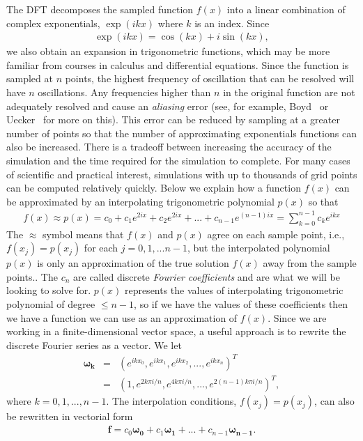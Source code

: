 The DFT decomposes the sampled function $f(x)$ into a linear combination of complex exponentials, $\exp(ikx)$ where $k$ is an index. Since
\begin{eqnarray}
\exp(ikx)=\cos(kx)+i\sin(kx),
\end{eqnarray}
we also obtain an expansion in trigonometric functions, which may be more familiar from courses in calculus and differential equations. Since the function is sampled at $n$ points, the highest frequency of oscillation that can be resolved will have $n$ oscillations. Any frequencies higher than $n$ in the original function are not adequately resolved and cause an \emph{aliasing} error (see, for example, Boyd~\cite{Boy01} or Uecker~\cite{Uec09} for more on this). This error can be reduced by sampling at a greater number of points so that the number of approximating exponentials functions can also be increased. There is a tradeoff between increasing the accuracy of the simulation and the time required for the simulation to complete. For many cases of scientific and practical interest, simulations with up to thousands of grid points can be computed relatively quickly. Below we explain how a function $f(x)$ can be approximated by an interpolating trigonometric polynomial $p(x)$ so that 
\begin{eqnarray}
f(x) \approx p(x)=c_0+c_1e^{2ix}+c_2e^{2ix}+...+c_{n-1} e^{(n-1)ix}=\sum\limits_{k=0}^{n-1} c_k e^{ikx}
\end{eqnarray} 
The $\approx$ symbol means that $f(x)$ and $p(x)$ agree on each sample point, i.e., $f(x_j)=p(x_j)$ for each $j=0,1,...n-1$, but the interpolated polynomial $p(x)$ is only an approximation of the true solution $f(x)$ away from the sample points.. The $c_n$ are called discrete \emph{Fourier coefficients} and are what we will be looking to solve for. $p(x)$ represents the values of interpolating trigonometric polynomial of degree $\leq n-1$, so if we have the values of these coefficients then we have a function we can use as an approximation of $f(x)$. Since we are working in a finite-dimensional vector space, a useful approach is to rewrite the discrete Fourier series as a vector. We let
\begin{eqnarray}
\bm{\omega_k}&=&(e^{ikx_0},e^{ikx_1},e^{ikx_2},...,e^{ikx_n})^T \\
&=& (1,e^{2k \pi i/n},e^{4k\pi i/n},...,e^{2(n-1)k\pi i/n})^T,
\end{eqnarray}
where $k=0,1,...,n-1$. The interpolation conditions, $f(x_j)=p(x_j)$, can also be rewritten in vectorial form
\begin{eqnarray}\label{eq:FourExp}
\bm{f}=c_0\bm{\omega_0}+c_1\bm{\omega_1}+...+c_{n-1} \bm{\omega_{n-1}}.
\end{eqnarray}
